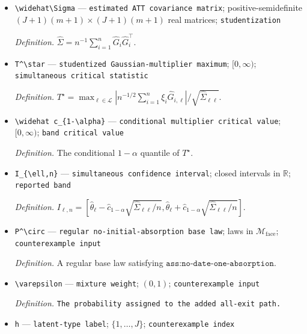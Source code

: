 \documentclass{article}
\begin{document}
\begin{itemize}
  \item \texttt{\textbackslash{}\allowbreak{}widehat\textbackslash{}\allowbreak{}Sigma} --- \texttt{estimated ATT covariance matrix}; positive-semidefinite \((J+1)(m+1)\times(J+1)(m+1)\) real matrices; \texttt{studentization}
  \par\smallskip\noindent\emph{Definition.} \(\widehat\Sigma=n^{-1}\sum_{i=1}^n\widehat G_i\widehat G_i^\top\).
  \item \texttt{T\textasciicircum{}\textbackslash{}\allowbreak{}star} --- \texttt{studentized Gaussian-\allowbreak{}multiplier maximum}; \([0,\infty)\); \texttt{simultaneous critical statistic}
  \par\smallskip\noindent\emph{Definition.} \(T^\star=\max_{\ell\in\mathcal L}|n^{-1/2}\sum_{i=1}^n\xi_i\widehat G_{i,\ell}|/\sqrt{\widehat\Sigma_{\ell\ell}}\).
  \item \texttt{\textbackslash{}\allowbreak{}widehat c\_\allowbreak{}\{1-\allowbreak{}\textbackslash{}\allowbreak{}alpha\}\allowbreak{}} --- \texttt{conditional multiplier critical value}; \([0,\infty)\); \texttt{band critical value}
  \par\smallskip\noindent\emph{Definition.} The conditional \(1-\alpha\) quantile of \(T^\star\).
  \item \texttt{I\_\allowbreak{}\{\textbackslash{}\allowbreak{}ell,\allowbreak{}n\}\allowbreak{}} --- \texttt{simultaneous confidence interval}; closed intervals in \(\mathbb R\); \texttt{reported band}
  \par\smallskip\noindent\emph{Definition.} \(I_{\ell,n}=[\widehat\theta_\ell\mathbin{-}\widehat c_{1-\alpha}\sqrt{\widehat\Sigma_{\ell\ell}/n},\widehat\theta_\ell\mathbin{+}\widehat c_{1-\alpha}\sqrt{\widehat\Sigma_{\ell\ell}/n}]\).
  \item \texttt{P\textasciicircum{}\textbackslash{}\allowbreak{}circ} --- \texttt{regular no-\allowbreak{}initial-\allowbreak{}absorption base law}; laws in \(\mathcal M_{\mathrm{face}}\); \texttt{counterexample input}
  \par\smallskip\noindent\emph{Definition.} A regular base law satisfying \(\texttt{ass:no-date-one-absorption}\).
  \item \texttt{\textbackslash{}\allowbreak{}varepsilon} --- \texttt{mixture weight}; \((0,1)\); \texttt{counterexample input}
  \par\smallskip\noindent\emph{Definition.} \texttt{The probability assigned to the added all-\allowbreak{}exit path.}
  \item \texttt{h} --- \texttt{latent-\allowbreak{}type label}; \(\{1,\ldots,J\}\); \texttt{counterexample index}

\end{itemize}
\end{document}
